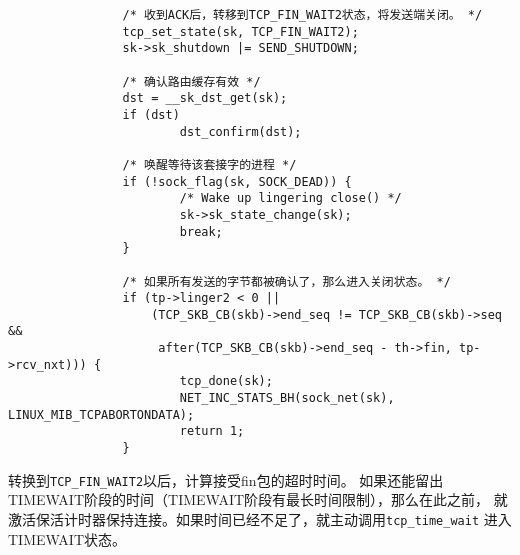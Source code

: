 \begin{verbatim}
                /* 收到ACK后，转移到TCP_FIN_WAIT2状态，将发送端关闭。 */
                tcp_set_state(sk, TCP_FIN_WAIT2);
                sk->sk_shutdown |= SEND_SHUTDOWN;

                /* 确认路由缓存有效 */
                dst = __sk_dst_get(sk);
                if (dst)
                        dst_confirm(dst);

                /* 唤醒等待该套接字的进程 */
                if (!sock_flag(sk, SOCK_DEAD)) {
                        /* Wake up lingering close() */
                        sk->sk_state_change(sk);
                        break;
                }

                /* 如果所有发送的字节都被确认了，那么进入关闭状态。 */
                if (tp->linger2 < 0 ||
                    (TCP_SKB_CB(skb)->end_seq != TCP_SKB_CB(skb)->seq &&
                     after(TCP_SKB_CB(skb)->end_seq - th->fin, tp->rcv_nxt))) {
                        tcp_done(sk);
                        NET_INC_STATS_BH(sock_net(sk), LINUX_MIB_TCPABORTONDATA);
                        return 1;
                }
\end{verbatim}
转换到\texttt{TCP_FIN_WAIT2}以后，计算接受fin包的超时时间。
如果还能留出TIMEWAIT阶段的时间（TIMEWAIT阶段有最长时间限制），那么在此之前，
就激活保活计时器保持连接。如果时间已经不足了，就主动调用\texttt{tcp_time_wait}
进入TIMEWAIT状态。
